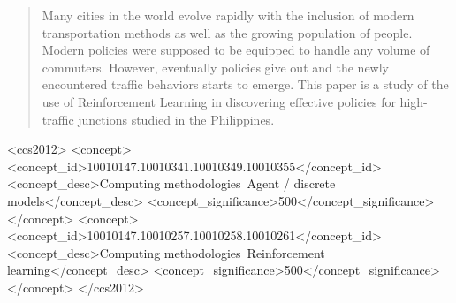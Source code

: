 \documentclass[sigconf]{acmart}
\begin{document}
\begin{abstract}
Many cities in the world evolve rapidly with the inclusion of modern transportation methods as well as the growing population of people. Modern policies were supposed to be equipped to handle any volume of commuters. However, eventually policies give out and the newly encountered traffic behaviors starts to emerge. This paper is a study of the use of Reinforcement Learning in discovering effective policies for high-traffic junctions studied in the Philippines.
\end{abstract}

%
%
\begin{CCSXML}
<ccs2012>
   <concept>
       <concept_id>10010147.10010341.10010349.10010355</concept_id>
       <concept_desc>Computing methodologies~Agent / discrete models</concept_desc>
       <concept_significance>500</concept_significance>
       </concept>
   <concept>
       <concept_id>10010147.10010257.10010258.10010261</concept_id>
       <concept_desc>Computing methodologies~Reinforcement learning</concept_desc>
       <concept_significance>500</concept_significance>
       </concept>
 </ccs2012>
\end{CCSXML}




\maketitle





\end{document}
